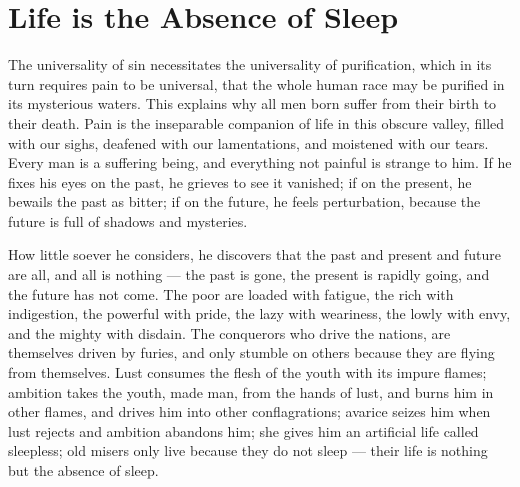 \section{Life is the Absence of Sleep}

\begin{quotationx}
The universality of sin necessitates the universality of purification, which in its turn requires pain to be universal, that the whole human race may be purified in its mysterious waters. This explains why all men born suffer from their birth to their death. Pain is the inseparable companion of life in this obscure valley, filled with our sighs, deafened with our lamentations, and moistened with our tears. Every man is a suffering being, and everything not painful is strange to him. If he fixes his eyes on the past, he grieves to see it vanished; if on the present, he bewails the past as bitter; if on the future, he feels perturbation, because the future is full of shadows and mysteries.

How little soever he considers, he discovers that the past and present and future are all, and all is nothing --- the past is gone, the present is rapidly going, and the future has not come. The poor are loaded with fatigue, the rich with indigestion, the powerful with pride, the lazy with weariness, the lowly with envy, and the mighty with disdain. The conquerors who drive the nations, are themselves driven by furies, and only stumble on others because they are flying from themselves. Lust consumes the flesh of the youth with its impure flames; ambition takes the youth, made man, from the hands of lust, and burns him in other flames, and drives him into other conflagrations; avarice seizes him when lust rejects and ambition abandons him; she gives him an artificial life called sleepless; old misers only live because they do not sleep --- their life is nothing but the absence of sleep.


\end{quotationx}



